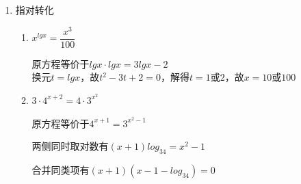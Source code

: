 \begin{enumerate}
\begin{enumerate}
\begin{enumerate}
\begin{jieda}
            \end{jieda}
            \item $(log_3x)^2+log_{\frac{1}{3}}(x^2)-3 = 0$
            \begin{jieda}
                $(log_3x)^2+log_{\frac{1}{3}}(x^2)-3 = 0$ \\
                首先统一底数，原方程等价于$(log_3x)^2-2log_3x-3 = 0$\\
                换元$t = log_3x, t \in \mathbf{R}$，故$t^2 - 2t - 3 = 0$，解得$t = -1$或$3$，因此$x = \dfrac{1}{3}$或$27$
            \end{jieda}
            \item $log_3(3^x-1) \cdot log_3(3^{x-1}-\dfrac{1}{3})=2$
            \begin{jieda}
                原方程等价于$log_3(3^x-1) \cdot log_3(\dfrac{1}{3}(3^{x}-1))=2$，即$log_3(3^x-1) \cdot (log_3(3^{x}-1)-1)=2$ \\
                换元$t = log_3(3^x-1), t \in \mathbf{R}$，故$t(t-1) = 2$，解得$t = 2$或$-1$ \\
                因此$3^x - 1 = 9$或$\dfrac{1}{3}$，故$x = log_310$或$log_3\dfrac{4}{3}$ 
            \end{jieda}
        \end{enumerate}
        \item 指对转化
        \begin{enumerate}
            \item $x^{lgx} = \dfrac{x^3}{100}$
            \begin{jieda}
                原方程等价于$lgx \cdot lgx = 3lgx - 2$ \\
                换元$t = lgx$，故$t^2 -3t+2 = 0$，解得$t = 1$或$2$，故$x = 10$或$100$
            \end{jieda}
            \item $3 \cdot  {4}^{x+ 2}  = 4 \cdot  {3}^{{x}^{2}}$
            \begin{jieda}
                原方程等价于${4}^{x+1}  = {3}^{{x}^{2}-1}$
    
                两侧同时取对数有$(x+1)log_34 = x^2 - 1$
    
                合并同类项有$(x+1)(x-1-log_34) = 0$
    

\end{jieda}
\end{enumerate}
\end{enumerate}
\end{enumerate}

